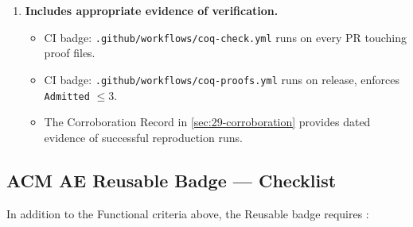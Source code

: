 \begin{enumerate}
\begin{verbatim}
# Step 2: Validate JSON
python3 -c "import json; \
  json.load(open('assertions/igla_assertions.json'))"

# Step 3: Run Rust tests
cargo test -p trios-igla-race -- invariants --nocapture
cargo test -p trios-igla-race -- lucas_closure --nocapture

# Step 4: Chapter audit
cargo run -p trios-phd -- audit --chapter 29

# Step 5: Full reproduction run
cargo run -p trios-phd -- reproduce --chapter 29
        \end{verbatim}
        All commands are expected to exit 0.
  \item \textbf{Includes appropriate evidence of verification.}
        \begin{itemize}
          \item CI badge: \texttt{.github/workflows/coq-check.yml}
                runs on every PR touching proof files.
          \item CI badge: \texttt{.github/workflows/coq-proofs.yml}
                runs on release, enforces \texttt{Admitted} $\le 3$.
          \item The Corroboration Record in
                \textsection\ref{sec:29-corroboration} provides dated
                evidence of successful reproduction runs.
        \end{itemize}
\end{enumerate}

\subsection{ACM AE Reusable Badge — Checklist}
\label{sec:29-reusable}

In addition to the Functional criteria above, the Reusable badge
requires \cite{acm_ae_policy}:

